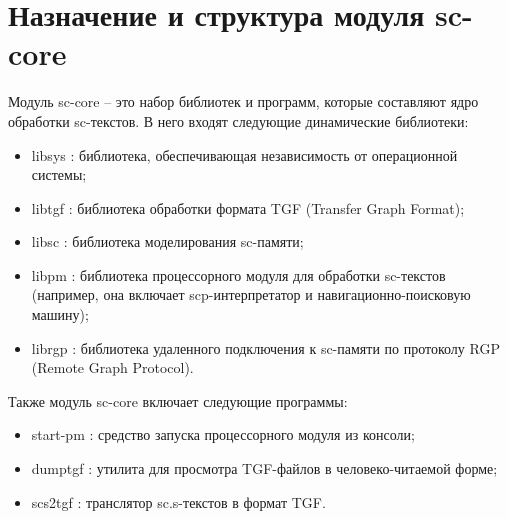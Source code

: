 
 

 

\section{Назначение и структура модуля sc-core}

Модуль sc-core – это набор библиотек и программ, которые составляют
ядро обработки sc-текстов. В него входят следующие динамические
библиотеки:
\begin{itemize}
\item libsys : библиотека, обеспечивающая независимость от
  операционной системы;
\item libtgf : библиотека обработки формата TGF (Transfer Graph Format);
\item libsc : библиотека моделирования sc-памяти;
\item libpm : библиотека процессорного модуля для обработки sc-текстов
  (например, она включает scp-интерпретатор и навигационно-поисковую
  машину);
\item librgp : библиотека удаленного подключения к sc-памяти по
  протоколу RGP (Remote Graph Protocol).
\end{itemize}

Также модуль sc-core включает следующие программы:
\begin{itemize}
\item start-pm : средство запуска процессорного модуля из консоли;
\item dumptgf : утилита для просмотра TGF-файлов в человеко-читаемой
  форме;
\item scs2tgf : транслятор sc.s-текстов в формат TGF.
\end{itemize}

